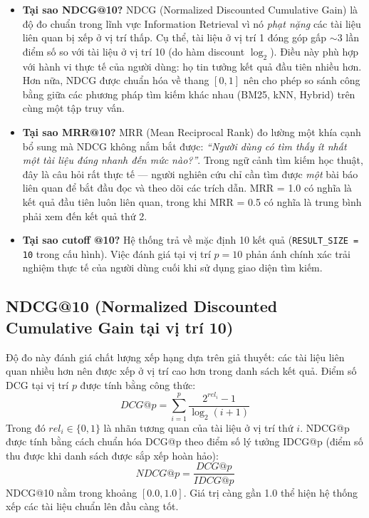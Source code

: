 \begin{itemize}
    \item \textbf{Tại sao NDCG@10?} NDCG (Normalized Discounted Cumulative Gain) là độ đo chuẩn trong lĩnh vực Information Retrieval vì nó \textit{phạt nặng} các tài liệu liên quan bị xếp ở vị trí thấp. Cụ thể, tài liệu ở vị trí 1 đóng góp gấp $\sim$3 lần điểm số so với tài liệu ở vị trí 10 (do hàm discount $\log_2$). Điều này phù hợp với hành vi thực tế của người dùng: họ tin tưởng kết quả đầu tiên nhiều hơn. Hơn nữa, NDCG được chuẩn hóa về thang $[0, 1]$ nên cho phép so sánh công bằng giữa các phương pháp tìm kiếm khác nhau (BM25, kNN, Hybrid) trên cùng một tập truy vấn.
    \item \textbf{Tại sao MRR@10?} MRR (Mean Reciprocal Rank) đo lường một khía cạnh bổ sung mà NDCG không nắm bắt được: \textit{``Người dùng có tìm thấy ít nhất một tài liệu đúng nhanh đến mức nào?''}. Trong ngữ cảnh tìm kiếm học thuật, đây là câu hỏi rất thực tế --- người nghiên cứu chỉ cần tìm được \textit{một} bài báo liên quan để bắt đầu đọc và theo dõi các trích dẫn. MRR = 1.0 có nghĩa là kết quả đầu tiên luôn liên quan, trong khi MRR = 0.5 có nghĩa là trung bình phải xem đến kết quả thứ 2.
    \item \textbf{Tại sao cutoff @10?} Hệ thống trả về mặc định 10 kết quả (\texttt{RESULT\_SIZE = 10} trong cấu hình). Việc đánh giá tại vị trí $p = 10$ phản ánh chính xác trải nghiệm thực tế của người dùng cuối khi sử dụng giao diện tìm kiếm.
\end{itemize}

\subsection{NDCG@10 (Normalized Discounted Cumulative Gain tại vị trí 10)}
Độ đo này đánh giá chất lượng xếp hạng dựa trên giả thuyết: các tài liệu liên quan nhiều hơn nên được xếp ở vị trí cao hơn trong danh sách kết quả. 
Điểm số DCG tại vị trí $p$ được tính bằng công thức:
\begin{equation}
DCG@p = \sum_{i=1}^{p} \frac{2^{rel_i} - 1}{\log_2(i + 1)}
\end{equation}
Trong đó $rel_i \in \{0, 1\}$ là nhãn tương quan của tài liệu ở vị trí thứ $i$. NDCG@p được tính bằng cách chuẩn hóa DCG@p theo điểm số lý tưởng IDCG@p (điểm số thu được khi danh sách được sắp xếp hoàn hảo):
\begin{equation}
NDCG@p = \frac{DCG@p}{IDCG@p}
\end{equation}
NDCG@10 nằm trong khoảng $[0.0, 1.0]$. Giá trị càng gần 1.0 thể hiện hệ thống xếp các tài liệu chuẩn lên đầu càng tốt.

